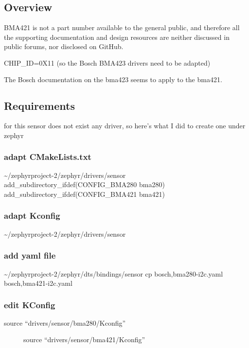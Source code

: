 \documentclass[letterpaper,10pt,english]{sphinxmanual}
\begin{document}
\subsection{Overview}
\label{\detokenize{drivers/bma421:overview}}
BMA421 is not a part number available to the general public, and therefore all the supporting documentation and design resources are neither discussed in public forums, nor disclosed on GitHub.

CHIP\_ID=0X11  (so the Bosch BMA423 drivers need to be adapted)

The Bosch documentation on the bma423 seems to apply to the bma421.


\subsection{Requirements}
\label{\detokenize{drivers/bma421:requirements}}
for this sensor does not exist any driver, so here’s what I did to create one under zephyr


\subsubsection{adapt CMakeLists.txt}
\label{\detokenize{drivers/bma421:adapt-cmakelists-txt}}
\textasciitilde{}/zephyrproject-2/zephyr/drivers/sensor
add\_subdirectory\_ifdef(CONFIG\_BMA280            bma280)
add\_subdirectory\_ifdef(CONFIG\_BMA421            bma421)


\subsubsection{adapt Kconfig}
\label{\detokenize{drivers/bma421:adapt-kconfig}}
\textasciitilde{}/zephyrproject-2/zephyr/drivers/sensor


\subsubsection{add yaml file}
\label{\detokenize{drivers/bma421:add-yaml-file}}
\textasciitilde{}/zephyrproject-2/zephyr/dts/bindings/sensor
cp bosch,bma280-i2c.yaml  bosch,bma421-i2c.yaml


\subsubsection{edit KConfig}
\label{\detokenize{drivers/bma421:edit-kconfig}}\begin{description}
\item[{source “drivers/sensor/bma280/Kconfig”}] \leavevmode
source “drivers/sensor/bma421/Kconfig”

\end{description}
\end{document}
